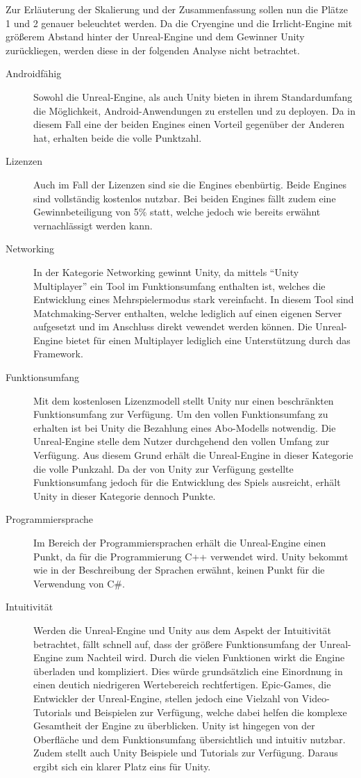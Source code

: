 	Zur Erläuterung der Skalierung und der Zusammenfassung sollen nun die Plätze 1 und 2 genauer beleuchtet werden.
	Da die Cryengine und die Irrlicht-Engine mit größerem Abstand hinter der Unreal-Engine und dem Gewinner Unity zurückliegen, werden diese in der folgenden Analyse nicht betrachtet.
	\begin{description}
		\item[Androidfähig]{Sowohl die Unreal-Engine, als auch Unity bieten in ihrem Standardumfang die Möglichkeit, Android-Anwendungen zu erstellen und zu deployen. Da in diesem Fall eine der beiden Engines einen Vorteil gegenüber der Anderen hat, erhalten beide die volle Punktzahl.}
		\item[Lizenzen]{Auch im Fall der Lizenzen sind sie die Engines ebenbürtig. Beide Engines sind vollständig kostenlos nutzbar. Bei beiden Engines fällt zudem eine Gewinnbeteiligung von 5\% statt, welche jedoch wie bereits erwähnt vernachlässigt werden kann.}
		\item[Networking]{In der Kategorie Networking gewinnt Unity, da mittels \enquote{Unity Multiplayer} ein Tool im Funktionsumfang enthalten ist, welches die Entwicklung eines Mehrspielermodus stark vereinfacht. In diesem Tool sind Matchmaking-Server enthalten, welche lediglich auf einen eigenen Server aufgesetzt und im Anschluss direkt vewendet werden können. Die Unreal-Engine bietet für einen Multiplayer lediglich eine Unterstützung durch das Framework.}
		\item[Funktionsumfang]{Mit dem kostenlosen Lizenzmodell stellt Unity nur einen beschränkten Funktionsumfang zur Verfügung. Um den vollen Funktionsumfang zu erhalten ist bei Unity die Bezahlung eines Abo-Modells notwendig. Die Unreal-Engine stelle dem Nutzer durchgehend den vollen Umfang zur Verfügung. Aus diesem Grund erhält die Unreal-Engine in dieser Kategorie die volle Punkzahl. Da der von Unity zur Verfügung gestellte Funktionsumfang jedoch für die Entwicklung des Spiels ausreicht, erhält Unity in dieser Kategorie dennoch Punkte.}
		\item[Programmiersprache]{Im Bereich der Programmiersprachen erhält die Unreal-Engine einen Punkt, da für die Programmierung C++ verwendet wird. Unity bekommt wie in der Beschreibung der Sprachen erwähnt, keinen Punkt für die Verwendung von C\#.}
		\item[Intuitivität]{Werden die Unreal-Engine und Unity aus dem Aspekt der Intuitivität betrachtet, fällt schnell auf, dass der größere Funktionsumfang der Unreal-Engine zum Nachteil wird. Durch die vielen Funktionen wirkt die Engine überladen und kompliziert. Dies würde grundsätzlich eine Einordnung in einen deutich niedrigeren Wertebereich rechtfertigen. Epic-Games, die Entwickler der Unreal-Engine, stellen jedoch eine Vielzahl von Video-Tutorials und Beispielen zur Verfügung, welche dabei helfen die komplexe Gesamtheit der Engine zu überblicken. Unity ist hingegen von der Oberfläche und dem Funktionsumfang übersichtlich und intuitiv nutzbar. Zudem stellt auch Unity Beispiele und Tutorials zur Verfügung. Daraus ergibt sich ein klarer Platz eins für Unity.}

\end{description}
